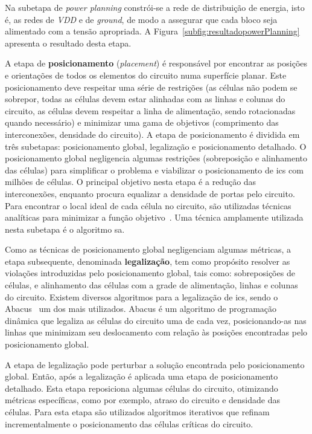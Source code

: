Na subetapa de \textit{power planning} constrói-se a rede de distribuição de energia, isto é, as redes de \textit{VDD} e de \textit{ground}, de modo a assegurar que cada bloco seja alimentado com a tensão apropriada. A Figura~\ref{subfig:resultadopowerPlanning} apresenta o resultado desta etapa.

A etapa de \textbf{posicionamento} (\textit{placement}) é responsável por encontrar as posições e orientações de todos os elementos do circuito numa superfície planar.
Este posicionamento deve respeitar uma série de restrições (as células não podem se sobrepor, todas as células devem estar alinhadas com as linhas e colunas do circuito, as células devem respeitar a linha de alimentação, sendo rotacionadas quando necessário) e minimizar uma gama de objetivos (comprimento das interconexões, densidade do circuito).
A etapa de posicionamento é dividida em três subetapas: posicionamento global, legalização e posicionamento detalhado.
O posicionamento global negligencia algumas restrições (sobreposição e alinhamento das células) para simplificar o problema e viabilizar o posicionamento de \acp{ic} com milhões de células.
O principal objetivo nesta etapa é a redução das interconexões,  enquanto procura equalizar a densidade de portas pelo circuito.
Para encontrar o local ideal de cada célula no circuito, são utilizadas técnicas analíticas para minimizar a função objetivo~\cite{tsay1988proud, eisenmann1998generic, Lin2013Polar}.
Uma técnica amplamente utilizada nesta subetapa é o algoritmo \ac{sa}. 

Como as técnicas de posicionamento global negligenciam algumas métricas, a etapa subsequente, denominada \textbf{legalização}, tem como propósito resolver as violações introduzidas pelo posicionamento global, tais como: sobreposições de células, e alinhamento das células com a grade de alimentação, linhas e colunas do circuito.
Existem diversos algoritmos para a legalização de \acp{ic}, sendo o Abacus~\cite{spindler2008abacus} um dos mais utilizados.
Abacus é um algoritmo de programação dinâmica que legaliza as células do circuito uma de cada vez, posicionando-as nas linhas que minimizam seu deslocamento com relação às posições encontradas pelo posicionamento global.

A etapa de legalização pode perturbar a solução encontrada pelo posicionamento global. Então, após a legalização é aplicada uma etapa de posicionamento detalhado.
Esta etapa reposiciona algumas células do circuito, otimizando métricas específicas, como por exemplo, atraso do circuito e densidade das células.
Para esta etapa são utilizados algoritmos iterativos que refinam incrementalmente o posicionamento das células críticas do circuito.

